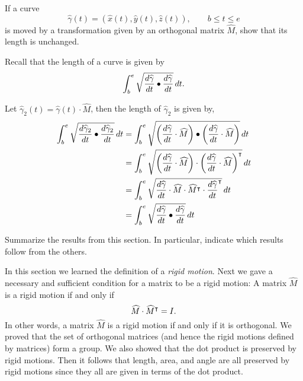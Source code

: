 \documentclass[newpage,hints,handout]{ximera}
\begin{document}
\begin{problem}
If a curve
\[
\hat{\gamma}(t) = (\hat{x}(t),\hat{y}(t),\hat{z}(t)),\qquad b\le t\le e
\]
is moved by a transformation given by an orthogonal matrix $\hat{M}$,
show that its length is unchanged.
\begin{hint}
  Recall that the length of a curve is given by
\[
\int_{b}^{e} \sqrt{\frac{d\widehat{\gamma}}{dt} \bullet \frac{d\widehat{\gamma}}{dt}}\,d t.
\]  
\end{hint}

\begin{freeResponse}
Let $\hat\gamma_{2}(t) = \hat\gamma(t) \cdot \hat{M}$, then the length of $\hat\gamma_{2}$ is given by,
\begin{align*}
\int_{b}^{e} \sqrt{\frac{d\widehat\gamma_{2}}{dt} \bullet \frac{d\widehat\gamma_{2}}{dt}}\,d t 
	&= \int_{b}^{e} \sqrt{ \left( \frac{d\widehat\gamma}{dt} \cdot \widehat{M} \right) \bullet 
	\left( \frac{d\widehat\gamma}{dt} \cdot \widehat{M} \right)}\,d t \\
	&= \int_{b}^{e} \sqrt{ \left( \frac{d\widehat\gamma}{dt} \cdot \widehat{M} \right) \cdot 
	\left( \frac{d\widehat\gamma}{dt} \cdot \widehat{M} \right)^\intercal}\,d t \\
	&= \int_{b}^{e} \sqrt{ \frac{d\widehat\gamma}{dt} \cdot \widehat{M} \cdot 
	 \widehat{M}^\intercal \cdot \frac{d\widehat\gamma}{dt}^\intercal}\,d t \\
	 &= \int_{b}^{e} \sqrt{ \frac{d\widehat\gamma}{dt} \bullet \frac{d\widehat\gamma}{dt}}\,d t
\end{align*}
\end{freeResponse}
\end{problem}


\begin{problem}
Summarize the results from this section. In particular, indicate which
results follow from the others.
\begin{freeResponse}
In this section we learned the definition of a \textit{rigid motion}. Next we gave a necessary and sufficient condition for a matrix to be a rigid motion: 
A matrix $\hat{M}$ is a rigid motion if and only if 
\[
\widehat{M}\cdot\widehat{M}^\intercal = I.
\]
In other words, a matrix $\hat{M}$ is a rigid motion if and only if it is orthogonal.
We proved that the set of orthogonal matrices (and hence the rigid motions defined by matrices) form a group. 
We also showed that the dot product is preserved by rigid motions. Then it follows that length, area, and angle are all preserved by rigid motions since they all are given in terms of the dot product. 


\end{freeResponse}
\end{problem}
\end{document}
